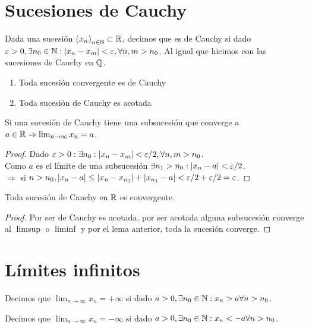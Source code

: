 \section{Sucesiones de Cauchy}

Dada una sucesión \({(x_n)}_{n \in \mathbb{N}} \subset \mathbb{R} \), decimos que es de Cauchy si dado \(\varepsilon > 0, \exists n_0 \in \mathbb{N} : |x_n - x_m| < \varepsilon, \forall n,m > n_0\). Al igual que hicimos con las sucesiones de Cauchy en \(\mathbb{Q} \).

\begin{enumerate}
  \item Toda sucesión convergente es de Cauchy
  \item Toda sucesión de Cauchy es acotada
\end{enumerate}

\begin{lemma}
  Si una sucesión de Cauchy tiene una subsucesión que converge a \(a \in \mathbb{R} \Rightarrow \lim_{n \to \infty} x_n = a\).
  \begin{proof}
    Dado \(\varepsilon > 0 : \exists n_0 : |x_n - x_m| < \varepsilon / 2, \forall n,m > n_0\). \\
    Como \(a\) es el límite de una subsucesión \(\exists n_1 > n_0 : |x_n - a| < \varepsilon / 2\). \\
    \(\Rightarrow \) si \(n > n_0, |x_n - a| \leq |x_n - x_{n_1}| + |x_{n_1} - a| < \varepsilon / 2 + \varepsilon / 2 = \varepsilon \).
  \end{proof}
\end{lemma}

\begin{theorem}
  Toda sucesión de Cauchy en \(\mathbb{R} \) es convergente.
  \begin{proof}
    Por ser de Cauchy es acotada, por ser acotada alguna subsucesión converge al \(\limsup\) o \(\liminf\) y por el lema anterior, toda la sucesión converge.
  \end{proof}
\end{theorem}

\section{Límites infinitos}

\begin{definition}
  Decimos que \(\lim_{n \to \infty} x_n = + \infty\) si dado \(a > 0, \exists n_0 \in \mathbb{N} : x_n > a \forall n > n_0\).
\end{definition}

\begin{definition}
  Decimos que \(\lim_{n \to \infty} x_n = - \infty\) si dado \(a > 0, \exists n_0 \in \mathbb{N} : x_n < -a \forall n > n_0\).
\end{definition}

